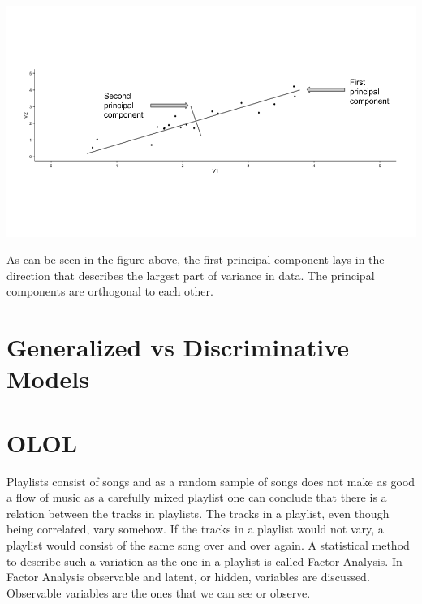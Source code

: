 \documentclass[a4paper,11pt]{kth-mag}
\begin{document}
\includegraphics[scale=0.42]{images/pca.png}

As can be seen in the figure above, the first principal component lays in the direction that describes the largest part of variance in data. The principal components are orthogonal to each other. 

\section{Generalized vs Discriminative Models}


\section{OLOL}
Playlists consist of songs and as a random sample of songs does not make as good a flow of music as a carefully mixed playlist one can conclude that there is a relation between the tracks in playlists. The tracks in a playlist, even though being correlated, vary somehow. If the tracks in a playlist would not vary, a playlist would consist of the same song over and over again. A statistical method to describe such a variation as the one in a playlist is called Factor Analysis\cite{mulaik1987brief}. In Factor Analysis observable and latent, or hidden, variables are discussed. Observable variables are the ones that we can see or observe. 
\end{document}
